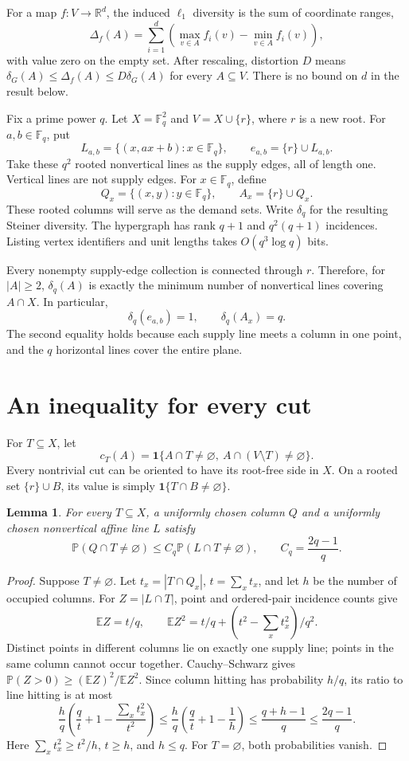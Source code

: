 \documentclass[11pt]{article}
\newtheorem{lemma}[theorem]{Lemma}
\newcommand{\F}{\mathbb F}
\newcommand{\E}{\mathbb E}
\newcommand{\Prob}{\mathbb P}
\newcommand{\ind}{\mathbf 1}
\begin{document}
For a map $f:V\to\mathbb R^d$, the induced $\ell_1$ diversity is the
sum of coordinate ranges,
\[
 \Delta_f(A)=\sum_{i=1}^d
 \left(\max_{v\in A}f_i(v)-\min_{v\in A}f_i(v)\right),
\]
with value zero on the empty set. After rescaling, distortion $D$ means
$\delta_G(A)\le\Delta_f(A)\le D\delta_G(A)$ for every $A\subseteq V$.
There is no bound on $d$ in the result below.

Fix a prime power $q$. Let $X=\F_q^2$ and $V=X\cup\{r\}$, where $r$ is a new
root. For $a,b\in\F_q$, put
\[
 L_{a,b}=\{(x,ax+b):x\in\F_q\},\qquad e_{a,b}=\{r\}\cup L_{a,b}.
\]
Take these $q^2$ rooted nonvertical lines as the supply edges, all of length
one. Vertical lines are not supply edges. For $x\in\F_q$, define
\[
 Q_x=\{(x,y):y\in\F_q\},\qquad A_x=\{r\}\cup Q_x.
\]
These rooted columns will serve as the demand sets. Write $\delta_q$ for
the resulting Steiner diversity. The hypergraph has rank $q+1$ and
$q^2(q+1)$ incidences. Listing vertex identifiers and unit lengths takes
$O(q^3\log q)$ bits.

Every nonempty supply-edge collection is connected through $r$. Therefore,
for $|A|\ge2$, $\delta_q(A)$ is exactly the minimum number of nonvertical
lines covering $A\cap X$. In particular,
\begin{equation}\label{eq:costs}
 \delta_q(e_{a,b})=1,\qquad \delta_q(A_x)=q.
\end{equation}
The second equality holds because each supply line meets a column in one
point, and the $q$ horizontal lines cover the entire plane.



\section{An inequality for every cut}
For $T\subseteq X$, let
\[
 c_T(A)=\ind\{A\cap T\ne\varnothing,\ A\cap(V\setminus T)\ne\varnothing\}.
\]
Every nontrivial cut can be oriented to have its root-free side in $X$.
On a rooted set $\{r\}\cup B$, its value is simply
$\ind\{T\cap B\ne\varnothing\}$.

\begin{lemma}\label{lem:hit}
For every $T\subseteq X$, a uniformly chosen column $Q$ and a uniformly
chosen nonvertical affine line $L$ satisfy
\[
 \Prob(Q\cap T\ne\varnothing)
 \le C_q\Prob(L\cap T\ne\varnothing),\qquad C_q=\frac{2q-1}{q}.
\]
\end{lemma}
\begin{proof}
Suppose $T\ne\varnothing$. Let $t_x=|T\cap Q_x|$, $t=\sum_x t_x$,
and let $h$ be the number of occupied columns. For $Z=|L\cap T|$,
point and ordered-pair incidence counts give
\[
 \E Z=t/q,\qquad
 \E Z^2=t/q+(t^2-\sum_x t_x^2)/q^2.
\]
Distinct points in different columns lie on exactly one supply line;
points in the same column cannot occur together. Cauchy--Schwarz gives
$\Prob(Z>0)\ge(\E Z)^2/\E Z^2$. Since column hitting has probability
$h/q$, its ratio to line hitting is at most
\[
 \frac hq\left(\frac qt+1-\frac{\sum_x t_x^2}{t^2}\right)
 \le\frac hq\left(\frac qt+1-\frac1h\right)
 \le\frac{q+h-1}{q}\le\frac{2q-1}{q}.
\]
Here $\sum_x t_x^2\ge t^2/h$, $t\ge h$, and $h\le q$.
For $T=\varnothing$, both probabilities vanish.
\end{proof}
\end{document}

